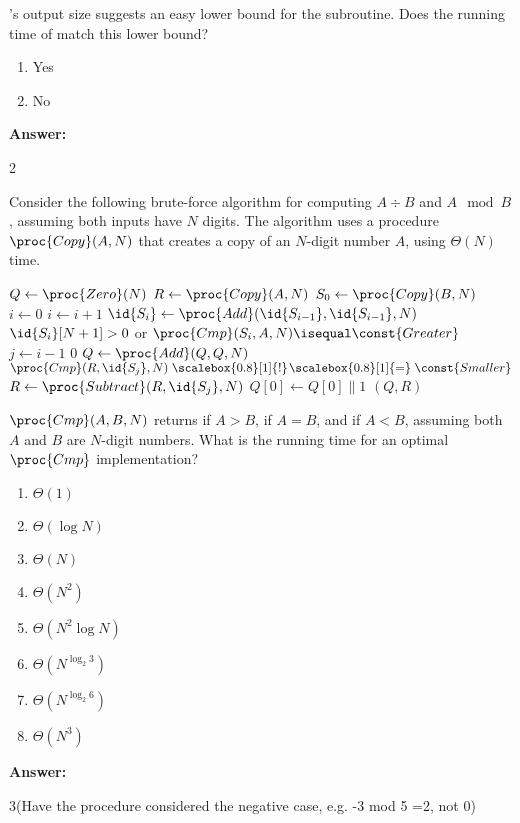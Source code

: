 \documentclass[12pt,twoside]{article}
\newcommand{\isnotequal}{\mathrel{\scalebox{0.8}[1]{!}\hspace*{1pt}\scalebox{0.8}[1]{=}}}
\newcommand{\answer}{
 \par\medskip
 \textbf{Answer:}
}
\newcommand{\answerIf}{ \answer
2
}
\newcommand{\answerIg}{ \answer
3(Have the procedure considered the negative case, e.g. -3 mod 5 =2, not 0)
}
\begin{document}
\begin{problems}
\begin{problemparts}
\problempart {} 's output size suggests an easy lower
bound for the subroutine. Does the running time of  match this
lower bound?
\begin{enumerate}
  \item Yes
  \item No
\end{enumerate}
\answerIf

\end{problemparts}

Consider the following brute-force algorithm for computing $A \div B$ and $A
\mod B$, assuming both inputs have $N$ digits. The algorithm uses a procedure
$\proc{Copy}(A, N)$ that creates a copy of an $N$-digit number $A$, using
$\Theta(N)$ time.

\begin{codebox}
\li $Q \gets \proc{Zero}(N)$ 
\li $R \gets \proc{Copy}(A, N)$ 
\li $S_0 \gets \proc{Copy}(B, N)$ 
\li $i \gets 0$
\li \Repeat \label{li:divmod-repeat}
\li   $i \gets i + 1$
\li   $\id{S_i} \gets \proc{Add}(\id{S_{i - 1}}, \id{S_{i - 1}}, N)$
\li \Until $\id{S_i}[N + 1] > 0$ or $\proc{Cmp}(S_i, A, N) \isequal
            \const{Greater}$
\li \For $j \gets i - 1$ \Downto $0$ \label{li:divmod-for}
\li   \Do
        $Q \gets \proc{Add}(Q, Q, N)$
\li     \If $\proc{Cmp}(R, \id{S_j}, N) \isnotequal \const{Smaller}$
\li     \Then
           $R \gets \proc{Subtract}(R, \id{S_j}, N)$
\li        $Q[0] \gets Q[0] \| 1$ 
        \End
      \End
\li \Return $(Q, R)$
\end{codebox}

\begin{problemparts}
\problempart {} $\proc{Cmp}(A, B, N)$ returns  if $A >
B$,  if $A = B$, and  if $A < B$, assuming both $A$
and $B$ are $N$-digit numbers. What is the running time for an optimal
$\proc{Cmp}$ implementation?
\begin{enumerate}
  \item $\Theta(1)$
  \item $\Theta(\log N)$
  \item $\Theta(N)$
  \item $\Theta(N^2)$
  \item $\Theta(N^2 \log N)$
  \item $\Theta(N^{\log_2 3})$
  \item $\Theta(N^{\log_2 6})$
  \item $\Theta(N^3)$
\end{enumerate}
\answerIg


\end{problemparts}
\end{problems}
\end{document}
